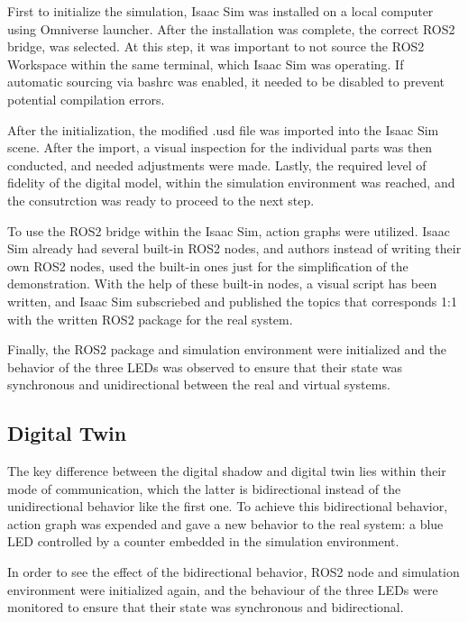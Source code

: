\documentclass[conference]{IEEEtran}
\begin{document}
    First to initialize the simulation, 
    Isaac Sim was installed on a local computer using Omniverse launcher. 
    After the installation was complete, the correct ROS2 bridge, was selected.
    At this step, it was important to not source the ROS2 Workspace within the same terminal, 
    which Isaac Sim was operating. If automatic sourcing via bashrc was enabled, 
    it needed to be disabled to prevent potential compilation errors.

    After the initialization, the modified .usd file was imported into the Isaac Sim scene. 
    After the import, a visual inspection for the individual parts was then conducted, and 
    needed adjustments were made. Lastly,  the required level of fidelity of the digital model, 
    within the simulation environment was reached, and the consutrction was ready to proceed to the next step.


    To use the ROS2 bridge within the Isaac Sim, action graphs were utilized. 
    Isaac Sim already had several built-in ROS2 nodes, and authors instead of writing their own ROS2 nodes, 
    used the built-in ones just for the simplification of the demonstration. 
    With the help of these built-in nodes, a visual script has been written, and Isaac Sim subscriebed
    and published the topics that corresponds 1:1 with  the written ROS2 package for the real system.

    Finally, the ROS2 package and simulation environment were initialized 
    and the behavior of the three LEDs was observed to ensure that their state was 
    synchronous and unidirectional between the real and virtual systems. 

    \subsection*{Digital Twin}\label{section:digital_twin}
    The key difference between the digital shadow and digital twin lies within their mode of communication, 
    which the latter is bidirectional instead of the unidirectional behavior like the first one.
    To achieve this bidirectional behavior, action graph was expended and gave a new 
    behavior to the real system: a blue LED  controlled by a counter embedded in the simulation environment. 

    In order to see the effect of the bidirectional behavior, ROS2 node and simulation environment 
    were initialized again, and the behaviour of the three LEDs were monitored to ensure that their state was 
    synchronous and bidirectional.
    
\end{document}
